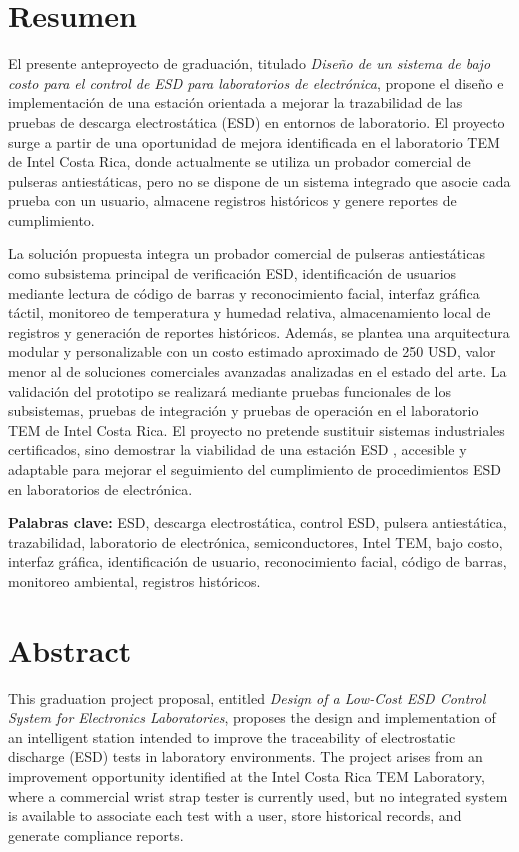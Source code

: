 \chapter*{Resumen}

El presente anteproyecto de graduación, titulado \textit{Diseño de un sistema de bajo costo 
para el control de ESD para laboratorios de electrónica}, propone el diseño e implementación 
de una estación orientada a mejorar la trazabilidad de las pruebas de descarga 
electrostática (ESD) en entornos de laboratorio. El proyecto surge a partir de una oportunidad 
de mejora identificada en el laboratorio TEM de Intel Costa Rica, donde actualmente se 
utiliza un probador comercial de pulseras antiestáticas, pero no se dispone de un sistema 
integrado que asocie cada prueba con un usuario, almacene registros históricos y genere 
reportes de cumplimiento.

La solución propuesta integra un probador comercial de pulseras antiestáticas como subsistema 
principal de verificación ESD, identificación de usuarios mediante lectura de código de barras 
y reconocimiento facial, interfaz gráfica táctil, monitoreo de temperatura y humedad relativa, 
almacenamiento local de registros y generación de reportes históricos. Además, se plantea una 
arquitectura modular y personalizable con un costo estimado aproximado de 250 USD, valor menor 
al de soluciones comerciales avanzadas analizadas en el estado del arte. La validación del 
prototipo se realizará mediante pruebas funcionales de los subsistemas, pruebas de integración 
y pruebas de operación en el laboratorio TEM de Intel Costa Rica. El proyecto no pretende 
sustituir sistemas industriales certificados, sino demostrar la viabilidad de una estación ESD 
, accesible y adaptable para mejorar el seguimiento del cumplimiento de procedimientos 
ESD en laboratorios de electrónica.

\textbf{Palabras clave:} ESD, descarga electrostática, control ESD, pulsera antiestática, 
trazabilidad, laboratorio de electrónica, semiconductores, Intel TEM, bajo costo, 
interfaz gráfica, identificación de usuario, reconocimiento facial, código de barras, 
monitoreo ambiental, registros históricos.


\chapter*{Abstract}

This graduation project proposal, entitled \textit{Design of a Low-Cost ESD Control System 
for Electronics Laboratories}, proposes the design and implementation of an intelligent 
station intended to improve the traceability of electrostatic discharge (ESD) tests in 
laboratory environments. The project arises from an improvement opportunity identified 
at the Intel Costa Rica TEM Laboratory, where a commercial wrist strap tester is 
currently used, but no integrated system is available to associate each test with a user, 
store historical records, and generate compliance reports.

